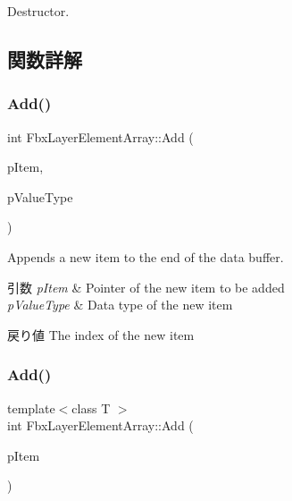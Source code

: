 Destructor. 



\subsection{関数詳解}
\mbox{\label{class_fbx_layer_element_array_a828c096f6e750eec65f59a86d0204e12}} 
\subsubsection{\texorpdfstring{Add()}{Add()}\hspace{0.1cm}{\footnotesize\ttfamily [1/2]}}
{\footnotesize\ttfamily int Fbx\+Layer\+Element\+Array\+::\+Add (\begin{DoxyParamCaption}\item[{const void $\ast$}]{p\+Item,  }\item[{\hyperlink{fbxpropertytypes_8h_a73913a5ddfb20e57c6f25e9e6784bd92}{E\+Fbx\+Type}}]{p\+Value\+Type }\end{DoxyParamCaption})}

Appends a new item to the end of the data buffer. 
\begin{DoxyParams}{引数}
{\em p\+Item} & Pointer of the new item to be added \\
\hline
{\em p\+Value\+Type} & Data type of the new item \\
\hline
\end{DoxyParams}
\begin{DoxyReturn}{戻り値}
The index of the new item 
\end{DoxyReturn}
\mbox{\label{class_fbx_layer_element_array_aa7749da74c326ba0961f0a29a7ef2258}} 
\subsubsection{\texorpdfstring{Add()}{Add()}\hspace{0.1cm}{\footnotesize\ttfamily [2/2]}}
{\footnotesize\ttfamily template$<$class T $>$ \\
int Fbx\+Layer\+Element\+Array\+::\+Add (\begin{DoxyParamCaption}\item[{T const \&}]{p\+Item }\end{DoxyParamCaption})\hspace{0.3cm}{\ttfamily [inline]}}

